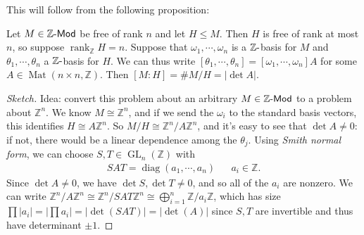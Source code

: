 This will follow from the following proposition:

\begin{proposition}[Index = Determinant]

Let \(M \in {\mathbb{Z}{\hbox{-}}\mathsf{Mod}}\) be free of rank \(n\)
and let \(H \leq M\). Then \(H\) is free of rank at most \(n\), so
suppose \(\operatorname{rank}_{\mathbb{Z}}H = n\). Suppose that
\(\omega_1, \cdots, \omega_n\) is a \({\mathbb{Z}}{\hbox{-}}\)basis for
\(M\) and \(\theta_1, \cdots, \theta_n\) a
\({\mathbb{Z}}{\hbox{-}}\)basis for \(H\). We can thus write
\({\left[ { \theta_1, \cdots, \theta_n} \right]} = {\left[ { \omega_1, \cdots, \omega_n } \right]} A\)
for some \(A \in \operatorname{Mat}(n\times n, {\mathbb{Z}})\). Then
\([M: H] = \#M/H = {\left\lvert { \det A } \right\rvert}\).

\end{proposition}

\begin{proof}[Sketch]

Idea: convert this problem about an arbitrary
\(M \in {\mathbb{Z}{\hbox{-}}\mathsf{Mod}}\) to a problem about
\({\mathbb{Z}}^n\). We know \(M \cong {\mathbb{Z}}^n\), and if we send
the \(\omega_i\) to the standard basis vectors, this identifies
\(H \cong A {\mathbb{Z}}^n\). So
\(M/H \cong {\mathbb{Z}}^n/A{\mathbb{Z}}^n\), and it's easy to see that
\(\det A \neq 0\): if not, there would be a linear dependence among the
\(\theta_j\). Using \emph{Smith normal form}, we can choose
\(S, T \in \operatorname{GL}_n({\mathbb{Z}})\) with
\begin{align*}
SAT = \operatorname{diag}(a_1, \cdots, a_n) && a_i \in {\mathbb{Z}}
.\end{align*}
Since \(\det A \neq 0\), we have \(\det S, \det T \neq 0\), and so all
of the \(a_i\) are nonzero. We can write
\({\mathbb{Z}}^n/A{\mathbb{Z}}^n \cong {\mathbb{Z}}^n/SAT{\mathbb{Z}}^n \cong \bigoplus_{i=1}^n {\mathbb{Z}}/a_i {\mathbb{Z}}\),
which has size
\(\prod {\left\lvert {a_i} \right\rvert} = {\left\lvert { \prod a_i } \right\rvert} = {\left\lvert { \det (SAT) } \right\rvert} = {\left\lvert { \det(A) } \right\rvert}\)
since \(S, T\) are invertible and thus have determinant \(\pm 1\).

\end{proof}

